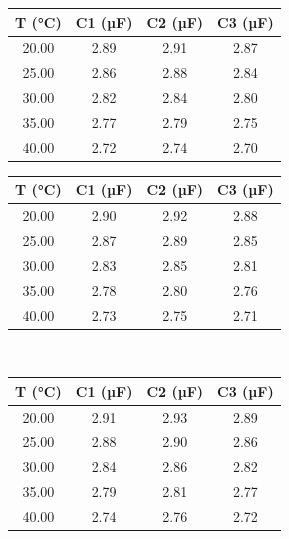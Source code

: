 \documentclass[12pt]{article}
\numberwithin{equation}{section}
\begin{document}
\begin{minipage}{0.5\textwidth}
    \centering
    \begin{tabular}{@{}cccc@{}}
    \toprule
    T (°C) & C1 (µF) & C2 (µF) & C3 (µF) \\ \midrule
    20.00               & 2.89             & 2.91             & 2.87             \\
    25.00               & 2.86             & 2.88             & 2.84             \\
    30.00               & 2.82             & 2.84             & 2.80             \\
    35.00               & 2.77             & 2.79             & 2.75             \\
    40.00               & 2.72             & 2.74             & 2.70             \\ \bottomrule
    \end{tabular}
\end{minipage}
\begin{minipage}{0.5\textwidth}
    \centering
    \begin{tabular}{@{}cccc@{}}
    \toprule
    T (°C) & C1 (µF) & C2 (µF) & C3 (µF) \\ \midrule
    20.00               & 2.90             & 2.92             & 2.88             \\
    25.00               & 2.87             & 2.89             & 2.85             \\
    30.00               & 2.83             & 2.85             & 2.81             \\
    35.00               & 2.78             & 2.80             & 2.76             \\
    40.00               & 2.73             & 2.75             & 2.71             \\ \bottomrule
    \end{tabular}
\end{minipage}
\vspace{1cm}\\
\noindent
\begin{minipage}{\textwidth}
    \centering
    \begin{tabular}{@{}cccc@{}}
    \toprule
    T (°C) & C1 (µF) & C2 (µF) & C3 (µF) \\ \midrule
    20.00               & 2.91             & 2.93             & 2.89             \\
    25.00               & 2.88             & 2.90             & 2.86             \\
    30.00               & 2.84             & 2.86             & 2.82             \\
    35.00               & 2.79             & 2.81             & 2.77             \\
    40.00               & 2.74             & 2.76             & 2.72             \\ \bottomrule
    \end{tabular}
\end{minipage}
\end{document}
